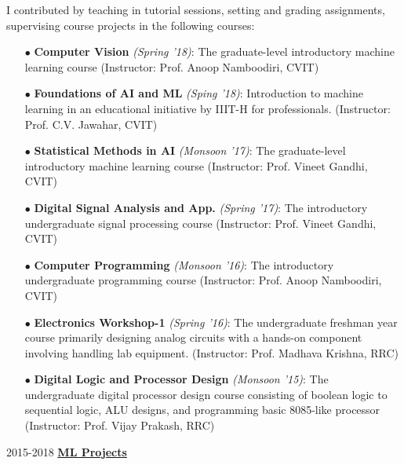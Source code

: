\documentclass[letterpaper]{page2_formatting} %
\begin{document}
\begin{twenty}
{I contributed by teaching in tutorial sessions, setting and grading assignments, supervising course projects in the following courses:\vspace{0.15cm}
    \begin{enumerate}
    \item[$\bullet$] {\bf Computer Vision} \textit{(Spring '18)}: The graduate-level introductory machine learning course (Instructor: Prof. Anoop Namboodiri, CVIT)\vspace{0.15cm}
    \item[$\bullet$] {\bf Foundations of AI and ML} \textit{(Sping '18)}: Introduction to machine learning in an educational initiative by IIIT-H for professionals. (Instructor: Prof. C.V. Jawahar, CVIT)\vspace{0.15cm}
      \item[$\bullet$] {\bf Statistical Methods in AI} \textit{(Monsoon '17)}: The graduate-level introductory machine learning course (Instructor: Prof. Vineet Gandhi, CVIT)\vspace{0.15cm}
      \item[$\bullet$] {\bf Digital Signal Analysis and App.} \textit{(Spring '17)}: The introductory undergraduate signal processing course (Instructor: Prof. Vineet Gandhi, CVIT)\vspace{0.15cm}
      \item[$\bullet$] {\bf Computer Programming} \textit{(Monsoon '16)}: The introductory undergraduate programming course (Instructor: Prof. Anoop Namboodiri, CVIT)\vspace{0.15cm}
      \item[$\bullet$] {\bf Electronics Workshop-1} \textit{(Spring '16)}: The undergraduate freshman year course primarily designing analog circuits with a hands-on component involving handling lab equipment. (Instructor: Prof. Madhava Krishna, RRC)\vspace{0.15cm}
      \item[$\bullet$] {\bf Digital Logic and Processor Design} \textit{(Monsoon '15)}: The undergraduate digital processor design course consisting of boolean logic to sequential logic, ALU designs, and programming basic 8085-like processor (Instructor: Prof. Vijay Prakash, RRC)
    \end{enumerate}
    }{2015-2018}
    \vspace{0.3cm}
\textbf{\large \underline{ML Projects}} \\

\end{twenty}
\end{document}

